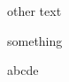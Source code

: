 \def\test{\ifmmode #2 \#2}


\def\test{\dimen5 {#2} \alpha}


\def\test{\dimen} other text


\if something \fi


 a\or b\or c\or d\else e\fi



